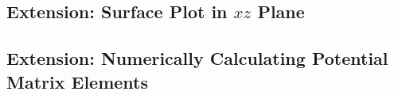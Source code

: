 \documentclass[]{article}
\begin{document}

\subsection{Extension: Surface Plot in $xz$ Plane}
\label{sec:extens-surface-plot-xz}


\subsection{Extension: Numerically Calculating Potential Matrix Elements}
\label{sec:extens-numer-calc-potent}

\end{document}
